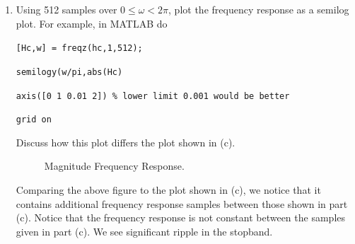 \documentclass[fleqn]{article}
\begin{document}
\begin{enumerate}
\begin{enumerate}[nolistsep]
			\begin{figure}[H]
				\centerline{}
				\caption{\doublespacing Comparison of $|H(k)|$ to $|H_c(e^{j\omega})|$ when Endpoints are Not Halved.}
				\label{freq_response_raw_endpoints}
			\end{figure}
			
			Comparing, Figure \ref{freq_response_halved_endpoints} to Figure \ref{freq_response_raw_endpoints}, it is clear that halving the endpoints preserves the magnitude of the frequency response samples $H[k]$, while selecting the raw endpoints does not. Therefore, we have chosen the best option for the causal, symmetric impulse response $h_c[n]$.
			
			\item Using 512 samples over $0 \leq \omega < 2\pi$, plot the frequency response as a semilog plot. For example, in MATLAB do
			
			\texttt{[Hc,w] = freqz(hc,1,512);}
			
			\texttt{semilogy(w/pi,abs(Hc)}
			
			\texttt{axis([0 1 0.01 2]) \% lower limit 0.001 would be better}
			
			\texttt{grid on}
			
			Discuss how this plot differs the plot shown in (c).
			
			\begin{figure}[H]
				\centerline{}
				\caption{Magnitude Frequency Response.}
			\end{figure}
			
			Comparing the above figure to the plot shown in (c), we notice that it contains additional frequency response samples between those shown in part (c). Notice that the frequency response is not constant between the samples given in part (c). We see significant ripple in the stopband.
		\end{enumerate}
	\end{enumerate}
	
	
	
\end{document}
